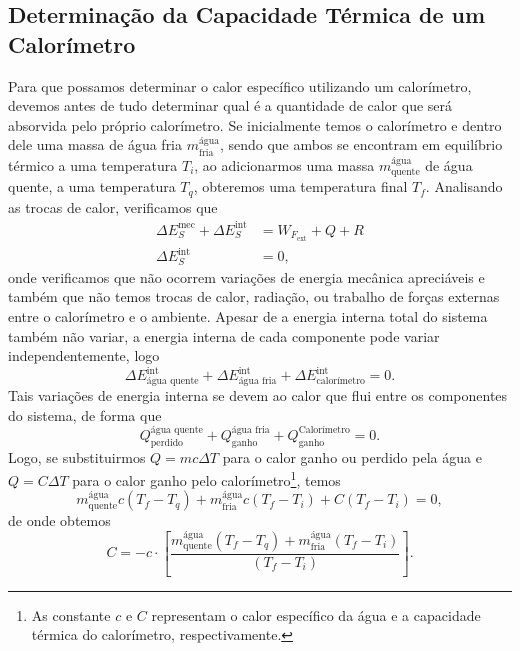 \subsection{Determinação da Capacidade Térmica de um Calorímetro}

Para que possamos determinar o calor específico utilizando um calorímetro, devemos antes de tudo determinar qual é a quantidade de calor que será absorvida pelo próprio calorímetro. Se inicialmente temos o calorímetro e dentro dele uma massa de água fria $m_{\text{fria}}^{\text{água}}$, sendo que ambos se encontram em equilíbrio térmico a uma temperatura $T_i$, ao adicionarmos uma massa $m_{\text{quente}}^{\text{água}}$ de água quente, a uma temperatura $T_q$, obteremos uma temperatura final $T_f$. Analisando as trocas de calor, verificamos que
\begin{align}
    \Delta E_S^{\text{mec}} + \Delta E_S^{\text{int}} &= W_{F_{\text{ext}}} + Q + R \\
    \Delta E_S^{\text{int}} &= 0,
\end{align}
%
onde verificamos que não ocorrem variações de energia mecânica apreciáveis e também que não temos trocas de calor, radiação, ou trabalho de forças externas entre o calorímetro e o ambiente. Apesar de a energia interna total do sistema também não variar, a energia interna de cada componente pode variar independentemente, logo
\begin{equation}
    \Delta E_{\text{água quente}}^{\text{int}} + \Delta E_{\text{água fria}}^{\text{int}} + \Delta E_{\text{calorímetro}}^{\text{int}} = 0.
\end{equation}
%
Tais variações de energia interna se devem ao calor que flui entre os componentes do sistema, de forma que
\begin{equation}
	Q^{\text{água quente}}_{\text{perdido}} + Q^{\text{água fria}}_{\text{ganho}} + Q^{\text{Calorímetro}}_{\text{ganho}} = 0.
\end{equation}
%
Logo, se substituirmos $Q = mc\Delta T$ para o calor ganho ou perdido pela água e $Q = C\Delta T$ para o calor ganho pelo calorímetro\footnote{As constante $c$ e $C$ representam o calor específico da água e a capacidade térmica do calorímetro, respectivamente.}, temos
\begin{equation}
	m_{\text{quente}}^{\text{água}} c (T_f - T_q) + m_{\text{fria}}^{\text{água}} c (T_f - T_i) + C(T_f - T_i) = 0,
\end{equation}
%
de onde obtemos
\begin{equation}
	C = -c\cdot\left[\frac{m_{\text{quente}}^{\text{água}}(T_f - T_q)+m_{\text{fria}}^{\text{água}}(T_f - T_i)}{(T_f - T_i)}\right].
\end{equation}

